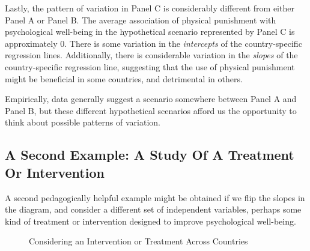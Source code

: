 \documentclass[
  letterpaper,
  DIV=11,
  numbers=noendperiod]{scrreprt}
\begin{document}
Lastly, the pattern of variation in Panel C is considerably different
from either Panel A or Panel B. The average association of physical
punishment with psychological well-being in the hypothetical scenario
represented by Panel C is approximately 0. There is some variation in
the \emph{intercepts} of the country-specific regression lines.
Additionally, there is considerable variation in the \emph{slopes} of
the country-specific regression line, suggesting that the use of
physical punishment might be beneficial in some countries, and
detrimental in others.

Empirically, data generally suggest a scenario somewhere between Panel A
and Panel B, but these different hypothetical scenarios afford us the
opportunity to think about possible patterns of variation.

\subsection{A Second Example: A Study Of A Treatment Or
Intervention}\label{a-second-example-a-study-of-a-treatment-or-intervention}

A second pedagogically helpful example might be obtained if we flip the
slopes in the diagram, and consider a different set of independent
variables, perhaps some kind of treatment or intervention designed to
improve psychological well-being.

\begin{figure}


\caption{\label{fig-variation2}Considering an Intervention or Treatment
Across Countries}

\end{figure}%
\end{document}
